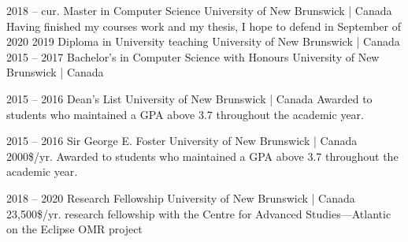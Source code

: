 \documentclass{developercv} %
\begin{document}

\begin{entrylist}
	\entry
	{2018 -- cur.}
	{Master in Computer Science}
	{University of New Brunswick | Canada}
	{Having finished my courses work and my thesis, I hope to defend in September of 2020}
	\entry
	{2019}
	{Diploma in University teaching}
	{University of New Brunswick | Canada}
	{}
	\entry
	{2015 -- 2017}
	{Bachelor's in Computer Science with Honours}
	{University of New Brunswick | Canada}
	{}
\end{entrylist}


\begin{entrylist}
	\entry
	{2015 -- 2016}
	{Dean's List}
	{University of New Brunswick | Canada}
	{Awarded to students who maintained a GPA above 3.7 throughout the academic year.}
\end{entrylist}


\begin{entrylist}
	\entry
	{2015 -- 2016}
	{Sir George E. Foster}
	{University of New Brunswick | Canada}
	{2000\$/yr. Awarded to students who maintained a GPA above 3.7 throughout the academic year.}

	\entry
	{2018 -- 2020}
	{Research Fellowship}
	{University of New Brunswick | Canada}
	{23,500\$/yr. research fellowship  with the Centre for Advanced Studies---Atlantic on the Eclipse OMR project}
\end{entrylist}

\end{document}
